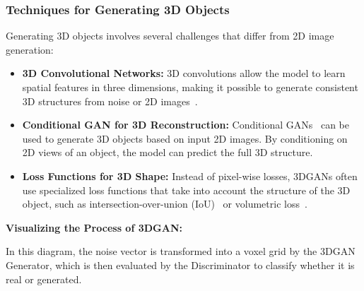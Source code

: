 \subsubsection{Techniques for Generating 3D Objects}
Generating 3D objects involves several challenges that differ from 2D image generation:

\begin{itemize}
    \item \textbf{3D Convolutional Networks:} 3D convolutions allow the model to learn spatial features in three dimensions, making it possible to generate consistent 3D structures from noise or 2D images~\cite{liu2020neural}.
    \item \textbf{Conditional GAN for 3D Reconstruction:} Conditional GANs~\cite{wang2018cgan} can be used to generate 3D objects based on input 2D images. By conditioning on 2D views of an object, the model can predict the full 3D structure.
    \item \textbf{Loss Functions for 3D Shape:} Instead of pixel-wise losses, 3DGANs often use specialized loss functions that take into account the structure of the 3D object, such as intersection-over-union (IoU)~\cite{nowozin2014optimal} or volumetric loss~\cite{xie2018tempogan}.
\end{itemize}

\textbf{Visualizing the Process of 3DGAN:}

\begin{center}
\end{center}

In this diagram, the noise vector is transformed into a voxel grid by the 3DGAN Generator, which is then evaluated by the Discriminator to classify whether it is real or generated.

